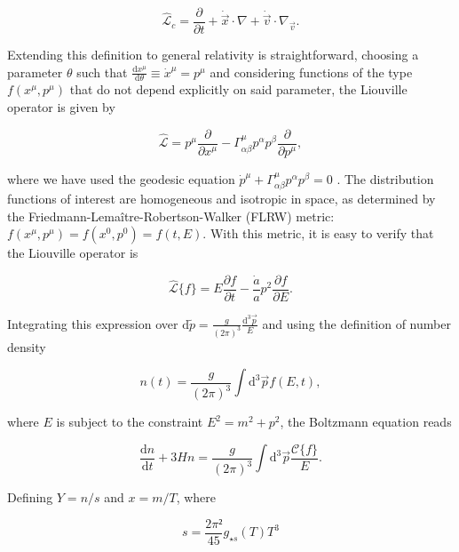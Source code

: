 \documentclass[final,5p,times,twocolumn, nopreprintline]{elsarticle}
\numberwithin{equation}{section}
\begin{document}
\begin{equation}
\hat{\mathcal{L}}_{c}=\dfrac{\partial}{\partial t}+\dot{\vec{x}}\cdot\nabla+\dot{\vec{v}}\cdot\nabla_{\vec{v}}. \label{eq:clas_liouville}
\end{equation}

Extending this definition to general relativity is straightforward, choosing a parameter $\theta$ such that $\frac{\mathrm{d}x^\mu}{\mathrm{d}\theta}\equiv\dot{x}^\mu=p^\mu$ and considering functions of the type $f(x^\mu,p^\mu)$ that do not depend explicitly on said parameter, the Liouville operator is given by

\begin{equation}
\hat{\mathcal{L}}=p^\mu\dfrac{\partial}{\partial x^\mu}-\Gamma^\mu_{\alpha\beta}p^\alpha p^\beta \dfrac{\partial}{\partial p^\mu}, \label{eq:rel_liouville}
\end{equation}

where we have used the geodesic equation $\dot{p}^\mu+\Gamma^\mu_{\alpha\beta}p^\alpha p^\beta=0$ \cite{bichteler1967cauchy}. The distribution functions of interest are homogeneous and isotropic in space, as determined by the Friedmann-Lemaître-Robertson-Walker (FLRW) metric: $f(x^\mu,p^\mu)=f(x^0,p^0)=f(t,E)$. With this metric, it is easy to verify that the Liouville operator is

\begin{equation}
\hat{\mathcal{L}}\{f\}=E\dfrac{\partial f}{\partial t}-\dfrac{\dot{a}}{a}p^2\dfrac{\partial f}{\partial E}. \label{eq:flrw_liouville}
\end{equation}

Integrating this expression over $\mathrm{d}\tilde{p}=\frac{g}{(2\pi)^3}\frac{\mathrm{d}^3\vec{p}}{E}$ and using the definition of number density

\begin{equation}
n(t)=\dfrac{g}{(2\pi)^3}\int\mathrm{d}^3\vec{p}f(E,t), \label{eq:num_dens}
\end{equation}

where $E$ is subject to the constraint $E^2=m^2+p^2$, the Boltzmann equation reads

\begin{equation}
\dfrac{\mathrm{d}n}{\mathrm{d}t}+3Hn=\dfrac{g}{(2\pi)^3}\int\mathrm{d}^3\vec{p}\dfrac{\mathcal{C}\{f\}}{E}. \label{eq:Boltz_lhs}
\end{equation}

Defining $Y=n/s$ and $x=m/T$, where 

\begin{equation}
s=\dfrac{2\pi²}{45}g_{\star s}(T)T^3 \label{eq:ent_dens}
\end{equation}
\end{document}
